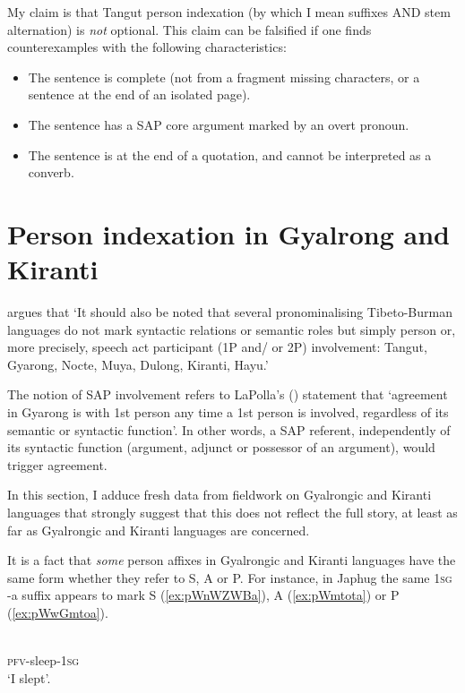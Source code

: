 \documentclass[oldfontcommands,oneside,a4paper,11pt]{article}
\newcommand{\ipa}[1]{{\phon \mbox{#1}}} %
\begin{document}
My claim is that Tangut person indexation (by which I mean suffixes AND stem alternation) is \textit{not} optional. This claim can be falsified if one finds counterexamples with the following characteristics:

\begin{itemize}
\item The sentence is complete (not from a fragment missing characters, or a sentence at the end of an isolated page).
\item The sentence has a SAP core argument marked by an overt pronoun.
\item The sentence is at the end of a quotation, and cannot be interpreted as a converb.
\end{itemize}

\section{Person indexation in Gyalrong and Kiranti} \label{sec:rgyalrong}
\citet[53]{zeisler15eat} argues  that `It should also be noted that several pronominalising Tibeto-Burman languages do not mark syntactic relations or semantic roles but simply person or, more precisely, speech act participant (1P and/ or 2P) involvement: Tangut, Gyarong, Nocte, Muya, Dulong, Kiranti, Hayu.' 

The notion of SAP involvement refers to LaPolla's (\citeyear[308]{lapolla92}) statement that `agreement in Gyarong is with 1st person any time a 1st person is involved, regardless of its semantic or syntactic function'. In other words, a SAP referent, independently of its syntactic function (argument, adjunct or possessor of an argument), would trigger agreement. 

In this section,  I adduce fresh data from fieldwork on Gyalrongic and Kiranti languages that strongly suggest that this does not reflect the full story, at least as far as Gyalrongic and Kiranti languages are concerned.

It is a fact that \textit{some} person affixes in Gyalrongic and Kiranti languages have the same form whether they refer to S, A or P. For instance, in Japhug the same \textsc{1sg} \ipa{-a} suffix appears to mark S (\ref{ex:pWnWZWBa}), A (\ref{ex:pWmtota}) or P (\ref{ex:pWwGmtoa}).

\begin{exe}
\ex \label{ex:pWnWZWBa}
\gll \ipa{pɯ-nɯʑɯβ-a} \\
\textsc{pfv}-sleep-\textsc{1sg} \\
\glt `I slept'.
\end{exe}
\end{document}
